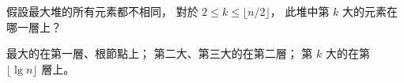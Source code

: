 \startEXERCISE
假設最大堆的所有元素都不相同，
對於 $2\le k\le \lfloor n/2\rfloor$，
此堆中第 $k$ 大的元素在哪一層上？
\stopEXERCISE

\startANSWER
最大的在第一層、根節點上；
第二大、第三大的在第二層；
第 $k$ 大的在第 $\lfloor \lg n\rfloor$ 層上。
\stopANSWER
